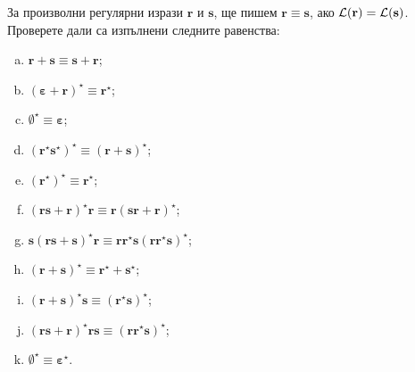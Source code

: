   
\begin{problem}
  За произволни регулярни изрази $\bm{r}$ и $\bm{s}$, ще пишем $\bm{r} \equiv \bm{s}$, ако $\mathcal{L}(\bf{r}) = \mathcal{L}(\bm{s})$.
  Проверете дали са изпълнени следните равенства:
  \begin{enumerate}[a)]
  \item 
    $\bm{r + s} \equiv \bm{s + r}$;
  \item
    $\bm{(\varepsilon + r)^\star} \equiv \bm{r^\star}$;
  \item
    $\bm{\emptyset^\star} \equiv \bm{\varepsilon}$;
  \item
    $\bm{(r^\star s^\star)^\star} \equiv \bm{(r+s)^\star}$;
  \item
    $\bm{(r^\star)^\star} \equiv \bm{r^\star}$;
  \item
    $\bm{(rs + r)^\star r} \equiv \bm{r(sr+r)^\star}$;
  \item
    $\bm{s(rs+s)^\star r} \equiv \bm{rr^\star s(rr^\star s)^\star}$;
  \item
    $\bm{(r+s)^\star} \equiv \bm{r^\star + s^\star}$;
  \item
    $\bm{(r+s)^\star s} \equiv \bm{(r^\star s)^\star}$;
  \item
    $\bm{(rs + r)^\star rs} \equiv \bm{(rr^\star s)^\star}$;
  \item
    $\bm{\emptyset^\star} \equiv \bm{\varepsilon^\star}$.
  \end{enumerate}
\end{problem}



